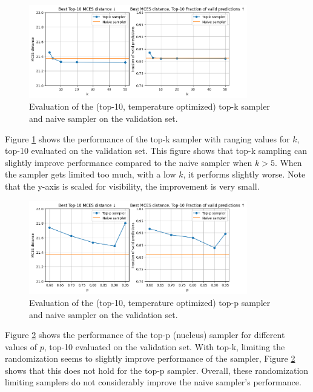 \begin{figure}[h]
    \centering
    \includegraphics[width=0.85\textwidth]{figures/results/samplers/top-k.png}
    \caption{Evaluation of the (top-10, temperature optimized) top-k sampler and naive sampler on the validation set.}
    \label{fig:top-k}
\end{figure}

Figure \ref{fig:top-k} shows the performance of the top-k sampler with ranging values for $k$, top-10 evaluated on the validation set.
This figure shows that top-k sampling can slightly improve performance compared to the naive sampler when $k > 5$.
When the sampler gets limited too much, with a low $k$, it performs slightly worse. 
Note that the y-axis is scaled for visibility, the improvement is very small.

\begin{figure}[h]
    \centering
    \includegraphics[width=0.85\textwidth]{figures/results/samplers/top-p.png}
    \caption{Evaluation of the (top-10, temperature optimized) top-p sampler and naive sampler on the validation set.}
    \label{fig:top-p}
\end{figure}

Figure \ref{fig:top-p} shows the performance of the top-p (nucleus) sampler for different values of $p$, top-10 evaluated on the validation set.
With top-k, limiting the randomization seems to slightly improve performance of the sampler, Figure \ref{fig:top-p} shows that this does not hold for the top-p sampler.
Overall, these randomization limiting samplers do not considerably improve the naive sampler's performance.


